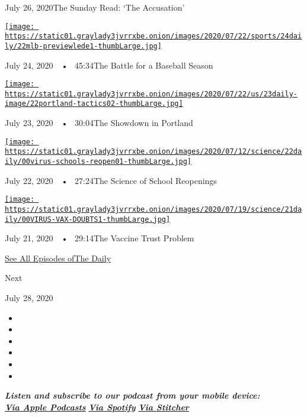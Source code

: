 July 26, 2020The Sunday Read: `The Accusation'

\href{https://www.nytimes3xbfgragh.onion/2020/07/24/podcasts/the-daily/mlb-baseball-season-coronavirus.html?action=click\&module=audio-series-bar\&region=header\&pgtype=Article}{\texttt{[image: https://static01.graylady3jvrrxbe.onion/images/2020/07/22/sports/24daily/22mlb-previewlede1-thumbLarge.jpg]}}

July 24, 2020~~•~ 45:34The Battle for a Baseball Season

\href{https://www.nytimes3xbfgragh.onion/2020/07/23/podcasts/the-daily/portland-protests.html?action=click\&module=audio-series-bar\&region=header\&pgtype=Article}{\texttt{[image: https://static01.graylady3jvrrxbe.onion/images/2020/07/22/us/23daily-image/22portland-tactics02-thumbLarge.jpg]}}

July 23, 2020~~•~ 30:04The Showdown in Portland

\href{https://www.nytimes3xbfgragh.onion/2020/07/22/podcasts/the-daily/school-reopenings-coronavirus.html?action=click\&module=audio-series-bar\&region=header\&pgtype=Article}{\texttt{[image: https://static01.graylady3jvrrxbe.onion/images/2020/07/12/science/22daily/00virus-schools-reopen01-thumbLarge.jpg]}}

July 22, 2020~~•~ 27:24The Science of School Reopenings

\href{https://www.nytimes3xbfgragh.onion/2020/07/21/podcasts/the-daily/coronavirus-vaccine.html?action=click\&module=audio-series-bar\&region=header\&pgtype=Article}{\texttt{[image: https://static01.graylady3jvrrxbe.onion/images/2020/07/19/science/21daily/00VIRUS-VAX-DOUBTS1-thumbLarge.jpg]}}

July 21, 2020~~•~ 29:14The Vaccine Trust Problem

\href{https://www.nytimes3xbfgragh.onion/column/the-daily}{See All
Episodes ofThe Daily}

Next

July 28, 2020

\begin{itemize}
\item
\item
\item
\item
\item
\item
\end{itemize}

\emph{\textbf{Listen and subscribe to our podcast from your mobile
device:}}\\
\textbf{\href{https://itunes.apple.com/us/podcast/the-daily/id1200361736?mt=2}{\emph{Via
Apple Podcasts}}} \emph{\textbf{\textbar{}}}
\textbf{\href{https://open.spotify.com/show/3IM0lmZxpFAY7CwMuv9H4g?si=SfuMSC55R1qprFsRZU3_zw}{\emph{Via
Spotify}}} \emph{\textbf{\textbar{}}}
\textbf{\href{http://www.stitcher.com/podcast/the-new-york-times/the-daily-10}{\emph{Via
Stitcher}}}


